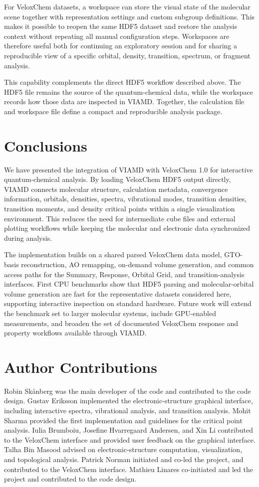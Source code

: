 \documentclass[journal=jacsat,manuscript=article]{achemso}
\begin{document}
For VeloxChem datasets, a workspace can store the visual state of the molecular scene together with representation settings and custom subgroup definitions. This makes it possible to reopen the same HDF5 dataset and restore the analysis context without repeating all manual configuration steps. Workspaces are therefore useful both for continuing an exploratory session and for sharing a reproducible view of a specific orbital, density, transition, spectrum, or fragment analysis.

This capability complements the direct HDF5 workflow described above. The HDF5 file remains the source of the quantum-chemical data, while the workspace records how those data are inspected in VIAMD. Together, the calculation file and workspace file define a compact and reproducible analysis package.

\section{Conclusions}
We have presented the integration of VIAMD with VeloxChem 1.0 for interactive quantum-chemical analysis. By loading VeloxChem HDF5 output directly, VIAMD connects molecular structure, calculation metadata, convergence information, orbitals, densities, spectra, vibrational modes, transition densities, transition moments, and density critical points within a single visualization environment. This reduces the need for intermediate cube files and external plotting workflows while keeping the molecular and electronic data synchronized during analysis.

The implementation builds on a shared parsed VeloxChem data model, GTO-basis reconstruction, AO remapping, on-demand volume generation, and common access paths for the Summary, Response, Orbital Grid, and transition-analysis interfaces. First CPU benchmarks show that HDF5 parsing and molecular-orbital volume generation are fast for the representative datasets considered here, supporting interactive inspection on standard hardware. Future work will extend the benchmark set to larger molecular systems, include GPU-enabled measurements, and broaden the set of documented VeloxChem response and property workflows available through VIAMD.

\section{Author Contributions}
Robin Skånberg was the main developer of the code and contributed to the code design. Gustav Eriksson implemented the electronic-structure graphical interface, including interactive spectra, vibrational analysis, and transition analysis. Mohit Sharma provided the first implementation and guidelines for the critical point analysis. Iulia Brumboiu, Josefine Hvarregaard Andersen, and Xin Li contributed to the VeloxChem interface and provided user feedback on the graphical interface. Talha Bin Masood advised on electronic-structure computation, visualization, and topological analysis. Patrick Norman initiated and co-led the project, and contributed to the VeloxChem interface. Mathieu Linares co-initiated and led the project and contributed to the code design.
\end{document}
